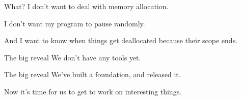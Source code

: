 \documentclass[14pt,aspectratio=169]{beamer}
\begin{document}
  \begin{frame}{What?}
    I don’t want to deal with memory allocation. \linebreak

    I don’t want my program to pause randomly.
    \linebreak

    And I want to know when things get deallocated because their scope ends.
  \end{frame}
  \begin{frame}{The big reveal}
    We don’t have any tools yet.
  \end{frame}
  \begin{frame}{The big reveal}
    We’ve built a foundation, and released it. \linebreak

    Now it’s time for us to get to work on interesting things.
  \end{frame}
\end{document}
